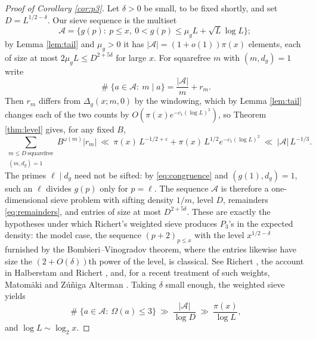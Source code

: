 \documentclass[11pt,reqno]{amsart}
\theoremstyle{plain}
\theoremstyle{definition}
\DeclareMathOperator{\Card}{\#}
\begin{document}
\begin{proof}[Proof of Corollary \ref{cor:p3}]
Let $\delta>0$ be small, to be fixed shortly, and set $D=L^{1/2-\delta}$. Our sieve sequence is the multiset
\[
\mathcal A=\{g(p):\ p\le x,\ 0<g(p)\le \mu_gL+\sqrt L\log L\};
\]
by Lemma \ref{lem:tail} and $\mu_g>0$ it has $|\mathcal A|=(1+o(1))\pi(x)$ elements, each of size at most $2\mu_gL\le D^{2+5\delta}$ for large $x$. For squarefree $m$ with $(m,d_g)=1$ write
\[
\Card\{a\in\mathcal A:\ m\mid a\}=\frac{|\mathcal A|}m+r_m .
\]
Then $r_m$ differs from $\Delta_g(x;m,0)$ by the windowing, which by Lemma \ref{lem:tail} changes each of the two counts by $O(\pi(x)e^{-c_1(\log L)^2})$, so Theorem \ref{thm:level} gives, for any fixed $B$,
\begin{equation}\label{eq:remainders}
\sum_{\substack{m\le D\ \text{squarefree}\\ (m,d_g)=1}}B^{\omega(m)}|r_m|\ \ll\ \pi(x)\,L^{-1/2+\varepsilon}+\pi(x)\,L^{1/2}e^{-c_1(\log L)^2}\ \ll\ |\mathcal A|\,L^{-1/3}.
\end{equation}
The primes $\ell\mid d_g$ need not be sifted: by \eqref{eq:congruence} and $(g(1),d_g)=1$, such an $\ell$ divides $g(p)$ only for $p=\ell$. The sequence $\mathcal A$ is therefore a one-dimensional sieve problem with sifting density $1/m$, level $D$, remainders \eqref{eq:remainders}, and entries of size at most $D^{2+5\delta}$. These are exactly the hypotheses under which Richert's weighted sieve produces $P_3$'s in the expected density: the model case, the sequence $(p+2)_{p\le x}$ with the level $x^{1/2-\delta}$ furnished by the Bombieri--Vinogradov theorem, where the entries likewise have size the $(2+O(\delta))$th power of the level, is classical. See Richert \cite{richert}, the account in Halberstam and Richert \cite[Chapter 9]{halberstamrichert}, and, for a recent treatment of such weights, Matom\"aki and Z\'u\~niga Alterman \cite{matomakizuniga}. Taking $\delta$ small enough, the weighted sieve yields
\[
\Card\{a\in\mathcal A:\ \Omega(a)\le3\}\ \gg\ \frac{|\mathcal A|}{\log D}\ \gg\ \frac{\pi(x)}{\log L},
\]
and $\log L\sim\log_2x$.
\end{proof}
\end{document}

